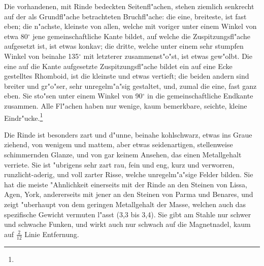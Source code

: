 \documentclass[a4paper, 11pt, oneside, german]{article}
\begin{document}
Die vorhandenen, mit Rinde bedeckten Seitenfl"achen, stehen ziemlich senkrecht auf der als Grundfl"ache betrachteten Bruchfl"ache: die eine, breiteste, ist fast eben; die n"achste, kleinste von allen, welche mit voriger unter einem Winkel von etwa 80$^{\circ}$ jene gemeinschaftliche Kante bildet, auf welche die Zuspitzungsfl"ache aufgesetzt ist, ist etwas konkav; die dritte, welche unter einem sehr stumpfen Winkel von beinahe 135$^{\circ}$ mit letzterer zusammenst"o"st, ist etwas gew"olbt. Die eine auf die Kante aufgesetzte Zuspitzungsfl"ache bildet ein auf eine Ecke gestelltes Rhomboid, ist die kleinste und etwas vertieft; die beiden andern sind breiter und gr"o"ser, sehr unregelm"a"sig gestaltet, und, zumal die eine, fast ganz eben. Sie sto"sen unter einem Winkel von 90$^{\circ}$ in die gemeinschaftliche Endkante zusammen. Alle Fl"achen haben nur wenige, kaum bemerkbare, seichte, kleine Eindr"ucke.\footnote{}

Die Rinde ist besonders zart und d"unne, beinahe kohlschwarz, etwas ins Graue ziehend, von wenigem und mattem, aber etwas seidenartigen, stellenweise schimmernden Glanze, und von gar keinem Ansehen, das einen Metallgehalt verriete. Sie ist "ubrigens sehr zart rau, fein und eng, kurz und verworren, runzlicht-aderig, und voll zarter Risse, welche unregelm"a"sige Felder bilden. Sie hat die meiste "Ahnlichkeit einerseits mit der Rinde an den Steinen von Lissa, Agen, York, andererseits mit jener an den Steinen von Parma und Benares, und zeigt "uberhaupt von dem geringen Metallgehalt der Masse, welchen auch das spezifische Gewicht vermuten l"asst (3,3 bis 3,4). Sie gibt am Stahle nur schwer und schwache Funken, und wirkt auch nur schwach auf die Magnetnadel, kaum auf $\frac{2}{12}$ Linie Entfernung.
\end{document}
